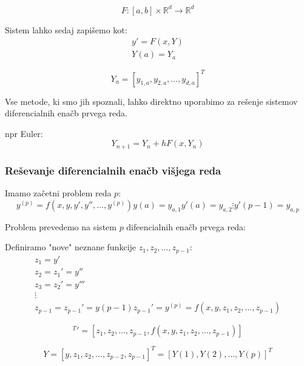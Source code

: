 \documentclass[a4paper,12pt]{article}
\theoremstyle{definition}
\theoremstyle{remark}
\newcommand{\R}{\mathbb{R}}
\begin{document}
\begin{equation*}
    F: [a, b]\times \R^d \to \R^d
\end{equation*}

Sistem lahko sedaj zapišemo kot:
\begin{align*}
    y' = F(x, Y) \\
    Y(a) = Y_a
\end{align*}

\begin{equation*}
    Y_a = [y_{1, a}, y_{2, a}, \dots, y_{d, a}]^T
\end{equation*}

Vse metode, ki smo jih spoznali, lahko direktno uporabimo za rešenje sistemov diferencialnih enačb prvega reda.

npr Euler:
\begin{equation*}
    Y_{n+1} = Y_n + h F(x, Y_n)
\end{equation*}

\subsubsection{Reševanje diferencialnih enačb višjega reda}
Imamo začetni problem reda $p$:
\begin{equation*}
    y^{(p)} = f(x, y, y', y'', \dots, y^{(p)})
    y(a) = y_{a, 1}
    y'(a) = y_{a, 2}
    \vdots
    y'{(p-1)} = y_{a, p}
\end{equation*}

Problem prevedemo na sistem $p$ difeencialnih enačb prvega reda:

Definiramo "nove" neznane funkcije $z_1, z_2, \dots, z_{p-1}$:
\begin{align*}
    z_1 = y'\\
    z_2 = z_1' = y'' \\
    z_3 = z_2' = y''' \\
    \vdots \\
    z_{p-1} = z_{p-1}' = y{(p-1)}
    z_{p-1}' = y^{(p)} = f(x, y, z_1, z_2, \dots, z_{p-1})
\end{align*}

\begin{equation*}
    [y, z_1, z_2, \dots, z_{p-2}, z_{p-1}]^T' = [z_1, z_2, \dots, z_{p-1}, f(x, y, z_1, z_2, \dots, z_{p-1})]
\end{equation*}

\begin{equation*}
    Y = [y, z_1, z_2, \dots, z_{p-2}, z_{p-1}]^T = [Y(1), Y(2), \dots, Y(p)]^T
\end{equation*}
\end{document}
